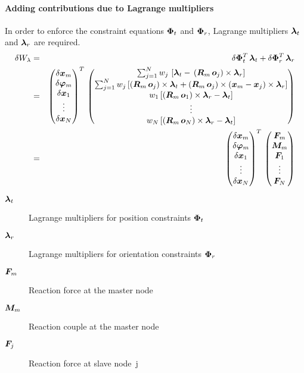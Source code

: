 \paragraph{Adding contributions due to Lagrange multipliers}
In order to enforce the constraint equations $\bm{\Phi}_t$ and $\bm{\Phi}_r$, Lagrange multipliers $\bm{\lambda}_t$ and $\bm{\lambda}_r$ are required.
\begin{eqnarray}
\delta W_{\lambda} & = & \delta\bm{\Phi}_t^T \, \bm{\lambda}_t + \delta\bm{\Phi}_r^T \, \bm{\lambda}_r \\
& = &
\begin{pmatrix}
\delta\bm{x}_m \\
\delta\bm{\varphi}_m \\
\delta\bm{x}_1 \\
\vdots{} \\
\delta\bm{x}_N
\end{pmatrix}^T \,
\begin{pmatrix}
\sum_{j=1}^N w_j\,\left[\bm{\lambda}_t - \,\left(\bm{R}_m\,\bm{o}_j\right)\times\bm{\lambda}_r\right] \\
\sum_{j=1}^N w_j\left[\left(\bm{R}_m\,\bm{o}_j\right)\times\bm{\lambda}_t+\left(\bm{R}_m\,\bm{o}_j\right)\times\left(\bm{x}_m - \bm{x}_j\right)\times\bm{\lambda}_r\right] \\
w_1\left[\left(\bm{R}_m\,\bm{o}_1\right)\times\bm{\lambda}_r - \bm{\lambda}_t\right] \\
\vdots{} \\
w_N\left[\left(\bm{R}_m\,\bm{o}_N\right)\times\bm{\lambda}_r - \bm{\lambda}_t\right]
\end{pmatrix} \\
& = &
\begin{pmatrix}
\delta\bm{x}_m \\
\delta\bm{\varphi}_m \\
\delta\bm{x}_1 \\
\vdots{} \\
\delta\bm{x}_N
\end{pmatrix}^T \,
\begin{pmatrix}
\bm{F}_m \\
\bm{M}_m \\
\bm{F}_1 \\
\vdots{} \\
\bm{F}_N
\end{pmatrix}
\end{eqnarray}
\begin{description}
\item[$\bm{\lambda}_t$] Lagrange multipliers for position constraints $\bm{\Phi}_t$
\item[$\bm{\lambda}_r$] Lagrange multipliers for orientation constraints $\bm{\Phi}_r$
\item[$\bm{F}_m$] Reaction force at the master node
\item[$\bm{M}_m$] Reaction couple at the master node
\item[$\bm{F}_j$] Reaction force at slave node~j
\end{description}

